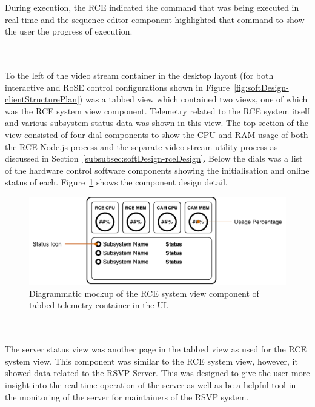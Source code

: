         During execution, the RCE indicated the command that was being executed in real time and the sequence editor component highlighted that command to show the user the progress of execution.
        
      \\\\
        To the left of the video stream container in the desktop layout (for both interactive and RoSE control configurations shown in Figure~\ref{fig:softDesign-clientStructurePlan}) was a tabbed view which contained two views, one of which was the RCE system view component. Telemetry related to the RCE system itself and various subsystem status data was shown in this view. The top section of the view consisted of four dial components to show the CPU and RAM usage of both the RCE Node.js process and the separate video stream utility process as discussed in Section~\ref{subsubsec:softDesign-rceDesign}. Below the dials was a list of the hardware control software components showing the initialisation and online status of each. Figure~\ref{fig:softDesign-rceSystemViewUIComponentDesign} shows the component design detail.
        
        \begin{figure}[h!]
          \centering
          \includegraphics[width=0.75\linewidth]{figures/softDesign-rceSystemViewUIComponentDesign}
          \caption[Diagrammatic mockup of the RCE system view component of tabbed telemetry container in the UI.]{Diagrammatic mockup of the RCE system view component of tabbed telemetry container in the UI.}
          \label{fig:softDesign-rceSystemViewUIComponentDesign}
        \end{figure}        
        
      \\\\
        The server status view was another page in the tabbed view as used for the RCE system view. This component was similar to the RCE system view, however, it showed data related to the RSVP Server. This was designed to give the user more insight into the real time operation of the server as well as be a helpful tool in the monitoring of the server for maintainers of the RSVP system.
        
